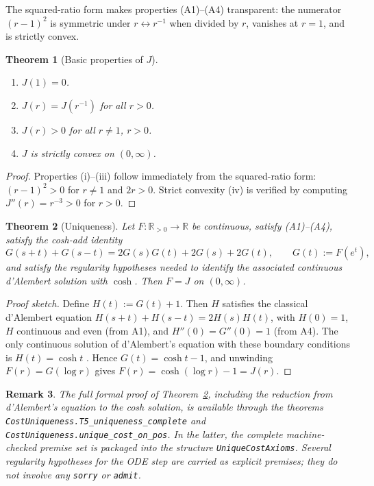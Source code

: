 \documentclass[11pt,a4paper]{article}
\newtheorem{theorem}{Theorem}
\newtheorem{remark}[theorem]{Remark}
\begin{document}
\noindent The squared-ratio form makes properties (A1)--(A4)
transparent: the numerator $(r-1)^2$ is symmetric under
$r\leftrightarrow r^{-1}$ when divided by $r$, vanishes at $r=1$, and
is strictly convex.

\begin{theorem}[Basic properties of $J$]
\label{thm:basic}
\leavevmode
\begin{enumerate}[label=(\roman*)]
  \item $J(1)=0$.
  \item $J(r)=J(r^{-1})$ for all $r>0$.
  \item $J(r)>0$ for all $r\neq 1$, $r>0$.
  \item $J$ is strictly convex on $(0,\infty)$.
\end{enumerate}
\end{theorem}

\begin{proof}
Properties (i)--(iii) follow immediately from the squared-ratio form:
$(r-1)^2>0$ for $r\neq 1$ and $2r>0$.  Strict convexity (iv) is
verified by computing $J''(r)=r^{-3}>0$ for $r>0$.
\end{proof}

\begin{theorem}[Uniqueness]
\label{thm:unique}
Let $F\colon\mathbb{R}_{>0}\to\mathbb{R}$ be continuous, satisfy
(A1)--(A4), satisfy the cosh-add identity
\[
  G(s+t)+G(s-t)=2G(s)G(t)+2G(s)+2G(t), \qquad G(t):=F(e^t),
\]
and satisfy the regularity hypotheses needed to identify the associated
continuous d'Alembert solution with $\cosh$.
Then $F=J$ on $(0,\infty)$.
\end{theorem}

\begin{proof}[Proof sketch]
Define $H(t):=G(t)+1$.  Then $H$ satisfies the classical d'Alembert
equation $H(s+t)+H(s-t)=2H(s)H(t)$, with $H(0)=1$, $H$ continuous and
even (from A1), and $H''(0)=G''(0)=1$ (from A4).  The only continuous
solution of d'Alembert's equation with these boundary conditions is
$H(t)=\cosh t$ \citep{aczel1966}.  Hence $G(t)=\cosh t-1$, and
unwinding $F(r)=G(\log r)$ gives $F(r)=\cosh(\log r)-1=J(r)$.
\end{proof}

\begin{remark}
The full formal proof of Theorem~\ref{thm:unique}, including the
reduction from d'Alembert's equation to the cosh solution, is available
through the theorems \texttt{CostUniqueness.T5\_uniqueness\_complete}
and \texttt{CostUniqueness.unique\_cost\_on\_pos}.  In the latter, the
complete machine-checked premise set is packaged into the structure
\texttt{UniqueCostAxioms}.  Several regularity hypotheses for the ODE
step are carried as explicit premises; they do not involve any
\texttt{sorry} or \texttt{admit}.
\end{remark}
\end{document}
